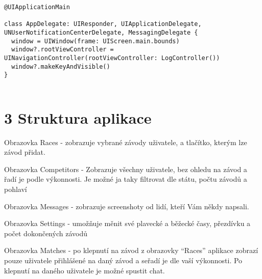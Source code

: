 \documentclass{article}
\begin{document}
\begin{verbatim}
@UIApplicationMain

class AppDelegate: UIResponder, UIApplicationDelegate,
UNUserNotificationCenterDelegate, MessagingDelegate {
  window = UIWindow(frame: UIScreen.main.bounds)
  window?.rootViewController = UINavigationController(rootViewController: LogController())
  window?.makeKeyAndVisible()
}
    
\end{verbatim}
\vspace{10 mm}




\vspace{10 mm}
\section*{3 Struktura aplikace}

Obrazovka Races - zobrazuje vybrané závody uživatele, a tlačítko, kterým lze závod přidat.

\hfill \break
Obrazovka Competitors - Zobrazuje všechny uživatele, bez ohledu na závod a řadí je podle výkonnosti. Je možné ja taky filtrovat dle státu, počtu závodů a pohlaví



 \hfill \break
Obrazovka Messages - zobrazuje screenshoty od lidí, kteří Vám někdy napsali.

 \hfill \break
Obrazovka Settings - umožňuje měnit své plavecké a běžecké časy, přezdívku a počet dokončených závodů



 \hfill \break
Obrazovka Matches - po klepnutí na závod z obrazovky “Races” aplikace zobrazí pouze uživatele přihlášené na daný závod a seřadí je dle vaší výkonnosti. Po klepnutí na daného uživatele je možné spustit chat.
\vspace{10 mm}
\end{document}
